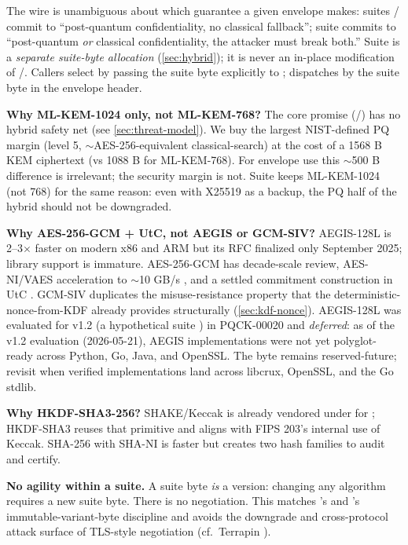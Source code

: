 The wire is unambiguous about which guarantee a given envelope makes: suites / commit to ``post-quantum confidentiality, no classical fallback''; suite  commits to ``post-quantum \emph{or} classical confidentiality, the attacker must break both.'' Suite  is a \emph{separate suite-byte allocation} (\cref{sec:hybrid}); it is never an in-place modification of /. Callers select by passing the suite byte explicitly to ;  dispatches by the suite byte in the envelope header.

\textbf{Why ML-KEM-1024 only, not ML-KEM-768?} The core promise (/) has no hybrid safety net (see \cref{sec:threat-model}). We buy the largest NIST-defined PQ margin (level 5, $\sim$AES-256-equivalent classical-search) at the cost of a 1568 B KEM ciphertext (vs 1088 B for ML-KEM-768). For envelope use this $\sim$500 B difference is irrelevant; the security margin is not. Suite  keeps ML-KEM-1024 (not 768) for the same reason: even with X25519 as a backup, the PQ half of the hybrid should not be downgraded.

\textbf{Why AES-256-GCM + UtC, not AEGIS or GCM-SIV?} AEGIS-128L is 2--3$\times$ faster on modern x86 and ARM \citep{rfc9678} but its RFC finalized only September 2025; library support is immature. AES-256-GCM has decade-scale review, AES-NI/VAES acceleration to $\sim$10 GB/s \citep{intelisa,ebacs}, and a settled commitment construction in UtC \citep{bellare2022commitment}. GCM-SIV duplicates the misuse-resistance property that the deterministic-nonce-from-KDF already provides structurally (\cref{sec:kdf-nonce}). AEGIS-128L was evaluated for v1.2 (a hypothetical suite ) in PQCK-00020 and \emph{deferred}: as of the v1.2 evaluation (2026-05-21), AEGIS implementations were not yet polyglot-ready across Python, Go, Java, and OpenSSL. The byte remains reserved-future; revisit when verified implementations land across libcrux, OpenSSL, and the Go stdlib.

\textbf{Why HKDF-SHA3-256?} SHAKE/Keccak is already vendored under  for \pqhash{}; HKDF-SHA3 reuses that primitive and aligns with FIPS 203's internal use of Keccak. SHA-256 with SHA-NI is faster but creates two hash families to audit and certify.

\textbf{No agility within a suite.} A suite byte \emph{is} a version: changing any algorithm requires a new suite byte. There is no negotiation. This matches \pqid{}'s and \pqhash{}'s immutable-variant-byte discipline and avoids the downgrade and cross-protocol attack surface of TLS-style negotiation (cf.~Terrapin \citep{terrapin}).
